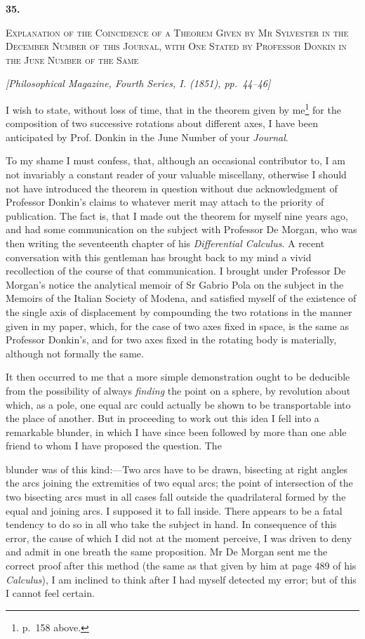 \documentclass[11pt]{article}
\newcommand{\paperhead}[3]{%
  \clearpage
  \begin{center}
  {\Large\bfseries #1.}\par\vspace{0.85em}
  {\large\scshape #2}\par\vspace{0.6em}
  {\itshape [#3]}\par
  \end{center}\vspace{0.4em}}
\newcommand{\sourcepage}[1]{\marginpar{\scriptsize p.~#1}}
\begin{document}
{{\paperhead{35}{Explanation of the Coincidence of a Theorem Given by Mr Sylvester in the December Number of this Journal, with One Stated by Professor Donkin in the June Number of the Same}{Philosophical Magazine, Fourth Series, I. (1851), pp.~44--46}

\sourcepage{217}
I wish to state, without loss of time, that in the theorem given by me\footnote{p.~158 above.} for the composition of two successive rotations about different axes, I have been anticipated by Prof. Donkin in the June Number of your \emph{Journal}.

To my shame I must confess, that, although an occasional contributor to, I am not invariably a constant reader of your valuable miscellany, otherwise I should not have introduced the theorem in question without due acknowledgment of Professor Donkin's claims to whatever merit may attach to the priority of publication. The fact is, that I made out the theorem for myself nine years ago, and had some communication on the subject with Professor De Morgan, who was then writing the seventeenth chapter of his \emph{Differential Calculus}. A recent conversation with this gentleman has brought back to my mind a vivid recollection of the course of that communication. I brought under Professor De Morgan's notice the analytical memoir of Sr Gabrio Pola on the subject in the Memoirs of the Italian Society of Modena, and satisfied myself of the existence of the single axis of displacement by compounding the two rotations in the manner given in my paper, which, for the case of two axes fixed in space, is the same as Professor Donkin's, and for two axes fixed in the rotating body is materially, although not formally the same.

It then occurred to me that a more simple demonstration ought to be deducible from the possibility of always \emph{finding} the point on a sphere, by revolution about which, as a pole, one equal arc could actually be shown to be transportable into the place of another. But in proceeding to work out this idea I fell into a remarkable blunder, in which I have since been followed by more than one able friend to whom I have proposed the question. The

\sourcepage{218}
blunder was of this kind:---Two arcs have to be drawn, bisecting at right angles the arcs joining the extremities of two equal arcs; the point of intersection of the two bisecting arcs must in all cases fall outside the quadrilateral formed by the equal and joining arcs. I supposed it to fall inside. There appears to be a fatal tendency to do so in all who take the subject in hand. In consequence of this error, the cause of which I did not at the moment perceive, I was driven to deny and admit in one breath the same proposition. Mr De Morgan sent me the correct proof after this method (the same as that given by him at page 489 of his \emph{Calculus}), I am inclined to think after I had myself detected my error; but of this I cannot feel certain.

}}
\end{document}
